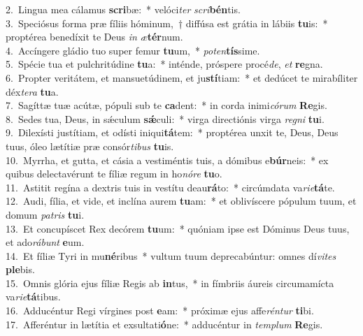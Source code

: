 {2.~}Lingua mea cálamus \textbf{scri}bæ:~* velóci\textit{ter} \textit{scri}\textbf{bén}tis.\\
{3.~}Speciósus forma præ fíliis hóminum,~† diffúsa est grátia in lábiis \textbf{tu}is:~* proptérea benedíxit te Deus \textit{in} \textit{æ}\textbf{tér}num.\\
{4.~}Accíngere gládio tuo super femur \textbf{tu}um,~* \textit{po}\textit{ten}\textbf{tís}sime.\\
{5.~}Spécie tua et pulchritúdine \textbf{tu}a:~* inténde, próspere procé\textit{de}, \textit{et} \textbf{re}gna.\\
{6.~}Propter veritátem, et mansuetúdinem, et ju\textbf{stí}tiam:~* et dedúcet te mirabíliter déx\textit{te}\textit{ra} \textbf{tu}a.\\
{7.~}Sagíttæ tuæ acútæ, pópuli sub te \textbf{ca}dent:~* in corda inimi\textit{có}\textit{rum} \textbf{Re}gis.\\
{8.~}Sedes tua, Deus, in sǽculum \textbf{sǽ}culi:~* virga directiónis virga \textit{re}\textit{gni} \textbf{tu}i.\\
{9.~}Dilexísti justítiam, et odísti iniqui\textbf{tá}tem:~* proptérea unxit te, Deus, Deus tuus, óleo lætítiæ præ consór\textit{ti}\textit{bus} \textbf{tu}is.\\
{10.~}Myrrha, et gutta, et cásia a vestiméntis tuis, a dómibus e\textbf{búr}neis:~* ex quibus delectavérunt te fíliæ regum in ho\textit{nó}\textit{re} \textbf{tu}o.\\
{11.~}Astitit regína a dextris tuis in vestítu deau\textbf{rá}to:~* circúmdata va\textit{ri}\textit{e}\textbf{tá}te.\\
{12.~}Audi, fília, et vide, et inclína aurem \textbf{tu}am:~* et oblivíscere pópulum tuum, et domum \textit{pa}\textit{tris} \textbf{tu}i.\\
{13.~}Et concupíscet Rex decórem \textbf{tu}um:~* quóniam ipse est Dóminus Deus tuus, et ado\textit{rá}\textit{bunt} \textbf{e}um.\\
{14.~}Et fíliæ Tyri in mu\textbf{né}ribus~* vultum tuum deprecabúntur: omnes dí\textit{vi}\textit{tes} \textbf{ple}bis.\\
{15.~}Omnis glória ejus fíliæ Regis ab \textbf{in}tus,~* in fímbriis áureis circumamícta va\textit{ri}\textit{e}\textbf{tá}tibus.\\
{16.~}Adducéntur Regi vírgines post \textbf{e}am:~* próximæ ejus affe\textit{rén}\textit{tur} \textbf{ti}bi.\\
{17.~}Afferéntur in lætítia et exsultati\textbf{ó}ne:~* adducéntur in \textit{tem}\textit{plum} \textbf{Re}gis.\\
